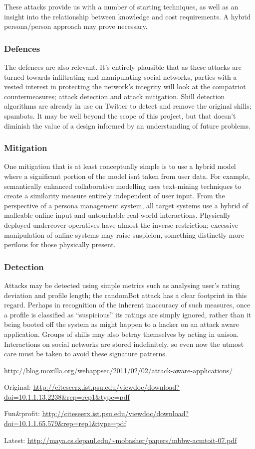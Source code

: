 These attacks provide us with a number of starting techniques, as well as an insight into the relationship between knowledge and cost requirements. A hybrid persona/person approach may prove necessary.

\subsubsection{Defences}

The defences are also relevant. It's entirely plausible that as these attacks
are turned towards infiltrating and manipulating social networks, parties with a
vested interest in protecting the network's integrity will look at the
compatriot countermeasures; attack detection and attack mitigation. Shill
detection algorithms are already in use on Twitter to detect and remove the
original shills; spambots. It may be well beyond the scope of this project, but
that doesn't diminish the value of a design informed by an understanding of
future problems.

\subsubsection{Mitigation}

One mitigation that is at least conceptually simple  is to use a hybrid model
where a significant portion of the model isn\'t taken from user data. For
example, semantically enhanced collaborative modelling uses text-mining
techniques to create a similarity measure entirely independent of user input.
From the perspective of a persona management system, all target systems use a
hybrid of malleable online input and untouchable real-world interactions.
Physically deployed undercover operatives have almost the inverse restriction;
excessive manipulation of online systems may raise suspicion, something
distinctly more perilous for those physically present.

\subsubsection{Detection}
Attacks may be detected using simple metrics such as analysing user's rating
deviation and profile length; the randomBot attack has a clear footprint in this
regard. Perhaps in recognition of the inherent inaccuracy of such measures, once
a profile is classified as ``suspicious'' its ratings are simply ignored, rather
than it being booted off the system as might happen to a hacker on an attack
aware application. Groups of shills may also betray themselves by acting in unison. Interactions on social networks are stored indefinitely, so even now the utmost care must be taken to avoid these signature patterns.


\url{http://blog.mozilla.org/webappsec/2011/02/02/attack-aware-applications/}

Original: \url{http://citeseerx.ist.psu.edu/viewdoc/download?doi=10.1.1.13.2238\&rep=rep1\&type=pdf}

Fun\&profit: \url{http://citeseerx.ist.psu.edu/viewdoc/download?doi=10.1.1.65.579\&rep=rep1\&type=pdf}

Latest: \url{http://maya.cs.depaul.edu/~mobasher/papers/mbbw-acmtoit-07.pdf}
